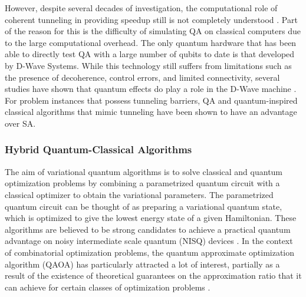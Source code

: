 \documentclass[fleqn,10pt]{wlscirep}
\def\change#1{#1}
\begin{document}
However, despite several decades of investigation, the computational role of coherent tunneling in providing speedup still is not completely understood \cite{RevModPhys.90.015002,katzgraber2015seeking,PhysRevX.6.031010}. Part of the reason for this is the difficulty of simulating QA on classical computers due to the large computational overhead. The only quantum hardware that has been able to directly test QA with a large number of qubits to date is that developed by D-Wave Systems.  While this technology still suffers from limitations such as the presence of decoherence, control errors, and limited connectivity, several studies have shown that quantum effects do play a role in the D-Wave machine \cite{albash2018demonstration,denchev2016computational,boixo2016computational}.   For problem instances that possess tunneling barriers, QA and quantum-inspired classical algorithms that mimic tunneling \cite{albash2018demonstration} have been shown to have an advantage over \change{SA}.   

  



\subsubsection*{Hybrid Quantum-Classical Algorithms}

The aim of variational quantum algorithms  \cite{cerezo2020variational} is to solve classical and quantum optimization problems by combining a parametrized quantum circuit with a classical optimizer to obtain the variational parameters.  The parametrized quantum circuit can be thought of as preparing a variational quantum state, which is optimized to give the lowest energy state of a given Hamiltonian.  These algorithms are believed to be strong candidates to achieve a practical quantum advantage on noisy intermediate scale quantum (NISQ) devices \cite{preskill2018quantum}. 
In the context of combinatorial optimization problems, the quantum approximate optimization algorithm (QAOA) \cite{farhi2014quantum} has particularly attracted a lot of interest, partially as a result of the existence of theoretical guarantees on the approximation ratio that it can achieve for certain classes of optimization problems \cite{farhi2014quantum,farhi2014quantumE3LIN2}.
\end{document}

